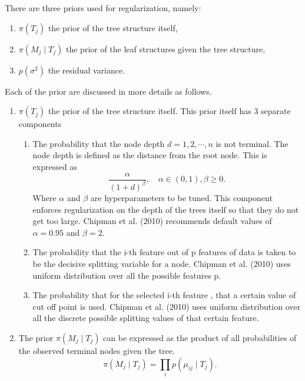 \documentclass{usiinftr}
\begin{document}
There are three priors used for regularization, namely:
\begin{enumerate}
\item $\pi(T_j)$ the prior of the tree structure itself,
\item $\pi(M_j \mid T_j)$ the prior of the leaf structures given the tree structure, 
\item $p(\sigma^2)$ the residual variance.
\end{enumerate}

Each of the prior are discussed in more details as follows.
\begin{enumerate}
\item $\pi(T_j)$ the prior of the tree structure itself. This prior itself has 3 separate components
			\begin{enumerate}
				\item The probability that the node depth $d = 1,2,\cdots,n$ is not terminal. The node depth is defined as the distance from the root node. This is expressed as 
			\begin{equation}\frac{\alpha}{(1+d)^{\beta}}, \quad \alpha \in (0,1), \beta \geq 0 . \end{equation}
			Where $\alpha$ and $\beta$ are hyperparameters to be tuned. This component enforces regularization on the depth of the trees itself so that they do not get too large. Chipman et al. (2010) recommends default values of $\alpha = 0.95$ and $\beta =2$.
				\item The probability that the i-th feature out of p features of data is taken to be the decisive splitting variable for a node. Chipman et al. (2010) uses uniform distribution over all the possible features p.
				\item The probability that for the selected i-th feature , that a certain value of cut off point is used. Chipman et al. (2010) uses uniform distribution over all the discrete possible splitting values of that certain feature.
			\end{enumerate} 
\item The prior $\pi(M_j \mid T_j)$ can be expressed as the product of all probabilities of the observed terminal nodes given the tree.
\begin{equation}\pi(M_j \mid T_j) = \prod_i p(\mu_{ij} \mid T_j). \end{equation}


\end{enumerate}
\end{document}
